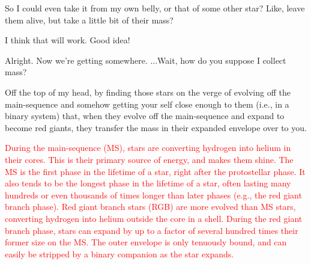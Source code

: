 \documentclass[main.tex]{subfiles}
\begin{document}
\par \Sterope So I could even take it from my own belly, or that of some other star?  Like, leave them alive, but take a little bit of their mass?

\par \Enrico I think that will work.  Good idea!

\par \Sterope Alright.  Now we're getting somewhere.  ...Wait, how do you suppose I collect mass?

\par \Enrico Off the top of my head, by finding those stars on the verge of evolving off the main-sequence and somehow getting your self close enough to them (i.e., in a binary system) that, when they evolve off the main-sequence and expand to become red giants, they transfer the mass in their expanded envelope over to you.

\begin{tcolorbox}[sharp corners, colback=red!30, colframe=red!80!blue, title=Stellar Evolution Beyond the Main-Sequence]
\par \textcolor{red} {During the main-sequence (MS), stars are converting hydrogen into helium in their cores.  This is their primary source of energy, and makes them shine.  The MS is the first phase in the lifetime of a star, right after the protostellar phase.  It also tends to be the longest phase in the lifetime of a star, often lasting many hundreds or even thousands of times longer than later phases (e.g., the red giant branch phase).
Red giant branch stars (RGB) are more evolved than MS stars, converting hydrogen into helium outside the core in a shell.  During the red giant branch phase, stars can expand by up to a factor of several hundred times their former size on the MS.  The outer envelope is only tenuously bound, and can easily be stripped by a binary companion as the star expands.
} 
\end{tcolorbox} 
\end{document}
